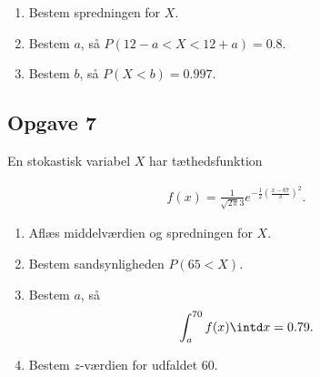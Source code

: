 \begin{enumerate}[label = \roman*)]
	\item Bestem spredningen for $X$. 
	\item Bestem $a$, så $P(12 - a < X < 12 + a) = 0.8$. 
	\item Bestem $b$, så $P(X < b) = 0.997$. 
\end{enumerate}

\subsection*{Opgave 7}

En stokastisk variabel $X$ har tæthedsfunktion

\begin{align*}
	f(x) = \frac{1}{\sqrt{2\pi}3}e^{-\frac{1}{2}\left(\frac{x-67}{3}\right)^2}.
\end{align*}

\begin{enumerate}[label = \roman*)]
	\item Aflæs middelværdien og spredningen for $X$.
	\item Bestem sandsynligheden $P(65 < X)$.
	\item Bestem $a$, så 
	\begin{align*}
		\int_a^{70} f(x) \intd x = 0.79.
	\end{align*}
	\item Bestem $z$-værdien for udfaldet 60.
\end{enumerate}


